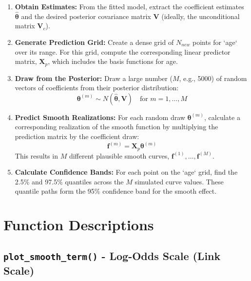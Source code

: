 \documentclass[11pt, a4paper]{article}
\begin{document}
\begin{enumerate}
    \item \textbf{Obtain Estimates:} From the fitted model, extract the coefficient estimates $\hat{\boldsymbol{\theta}}$ and the desired posterior covariance matrix $\mathbf{V}$ (ideally, the unconditional matrix $\mathbf{V}_c$).

    \item \textbf{Generate Prediction Grid:} Create a dense grid of $N_{new}$ points for `age` over its range. For this grid, compute the corresponding linear predictor matrix, $\mathbf{X}_p$, which includes the basis functions for age.

    \item \textbf{Draw from the Posterior:} Draw a large number ($M$, e.g., 5000) of random vectors of coefficients from their posterior distribution:
    \begin{equation*}
        \boldsymbol{\theta}^{(m)} \sim N(\hat{\boldsymbol{\theta}}, \mathbf{V}) \quad \text{for } m = 1, \dots, M
    \end{equation*}
    
    \item \textbf{Predict Smooth Realizations:} For each random draw $\boldsymbol{\theta}^{(m)}$, calculate a corresponding realization of the smooth function by multiplying the prediction matrix by the coefficient draw:
    \begin{equation*}
        \mathbf{f}^{(m)} = \mathbf{X}_p \boldsymbol{\theta}^{(m)}
    \end{equation*}
    This results in $M$ different plausible smooth curves, $\mathbf{f}^{(1)}, \dots, \mathbf{f}^{(M)}$.

    \item \textbf{Calculate Confidence Bands:} For each point on the `age` grid, find the 2.5\% and 97.5\% quantiles across the $M$ simulated curve values. These quantile paths form the 95\% confidence band for the smooth effect.
\end{enumerate}



\section{Function Descriptions}

\subsection*{\texttt{plot\_smooth\_term()} - Log-Odds Scale (Link Scale)}
\end{document}
